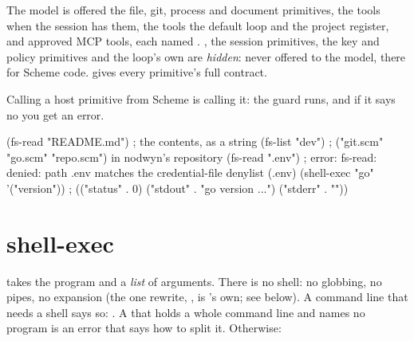 The model is offered the file, git, process and document primitives, the
 tools when the session has them, the tools the default loop
and the project register, and approved MCP tools, each named
. , the session primitives, the key and
policy primitives and the loop's own are \emph{hidden}: never offered to the
model, there for Scheme code.  gives every primitive's
full contract.

Calling a host primitive from Scheme is calling it: the guard runs, and if
it says no you get an error.

\begin{scm}
(fs-read "README.md")         ; the contents, as a string
(fs-list "dev")               ; ("git.scm" "go.scm" "repo.scm")   in nodwyn's repository
(fs-read ".env")              ; error: fs-read: denied: path .env matches the credential-file denylist (.env)
(shell-exec "go" '("version"))
; (("status" . 0) ("stdout" . "go version ...\n") ("stderr" . ""))
\end{scm}

\section{shell-exec}

 takes the program and a \emph{list} of arguments. There is
no shell: no globbing, no pipes, no  expansion (the one
rewrite, , is \nodwyn's own; see below). A command line that
needs a shell says so: . A 
that holds a whole command line and names no program is an error that says
how to split it. Otherwise:

